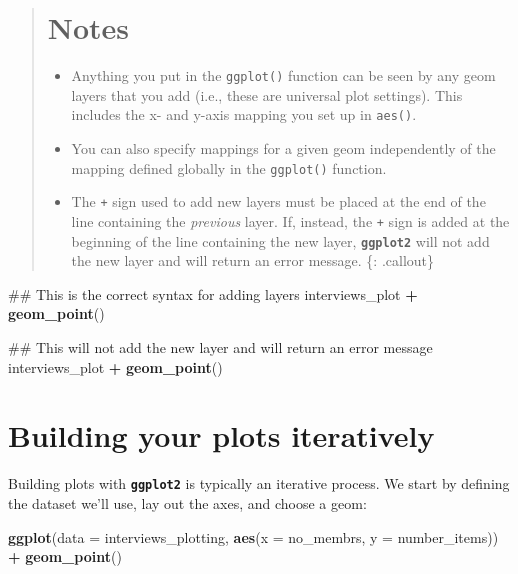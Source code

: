 \documentclass[]{book}
\newenvironment{Shaded}{\begin{snugshade}}{\end{snugshade}}
\newcommand{\KeywordTok}[1]{\textcolor[rgb]{0.13,0.29,0.53}{\textbf{#1}}}
\newcommand{\DataTypeTok}[1]{\textcolor[rgb]{0.13,0.29,0.53}{#1}}
\newcommand{\StringTok}[1]{\textcolor[rgb]{0.31,0.60,0.02}{#1}}
\newcommand{\OperatorTok}[1]{\textcolor[rgb]{0.81,0.36,0.00}{\textbf{#1}}}
\newcommand{\NormalTok}[1]{#1}
\providecommand{\tightlist}{%
  \setlength{\itemsep}{0pt}\setlength{\parskip}{0pt}}
\begin{document}
\begin{quote}
\section{Notes}\label{notes}

\begin{itemize}
\tightlist
\item
  Anything you put in the \texttt{ggplot()} function can be seen by any
  geom layers that you add (i.e., these are universal plot settings).
  This includes the x- and y-axis mapping you set up in \texttt{aes()}.
\item
  You can also specify mappings for a given geom independently of the
  mapping defined globally in the \texttt{ggplot()} function.
\item
  The \texttt{+} sign used to add new layers must be placed at the end
  of the line containing the \emph{previous} layer. If, instead, the
  \texttt{+} sign is added at the beginning of the line containing the
  new layer, \textbf{\texttt{ggplot2}} will not add the new layer and
  will return an error message. \{: .callout\}
\end{itemize}
\end{quote}

\begin{Shaded}
\begin{Highlighting}[]
\NormalTok{## This is the correct syntax for adding layers}
\NormalTok{interviews_plot }\OperatorTok{+}
\StringTok{    }\KeywordTok{geom_point}\NormalTok{()}

\NormalTok{## This will not add the new layer and will return an error message}
\NormalTok{interviews_plot}
\OperatorTok{+}\StringTok{ }\KeywordTok{geom_point}\NormalTok{()}
\end{Highlighting}
\end{Shaded}

\section{Building your plots
iteratively}\label{building-your-plots-iteratively}

Building plots with \textbf{\texttt{ggplot2}} is typically an iterative
process. We start by defining the dataset we'll use, lay out the axes,
and choose a geom:

\begin{Shaded}
\begin{Highlighting}[]
\KeywordTok{ggplot}\NormalTok{(}\DataTypeTok{data =}\NormalTok{ interviews_plotting, }\KeywordTok{aes}\NormalTok{(}\DataTypeTok{x =}\NormalTok{ no_membrs, }\DataTypeTok{y =}\NormalTok{ number_items)) }\OperatorTok{+}
\StringTok{    }\KeywordTok{geom_point}\NormalTok{()}
\end{Highlighting}
\end{Shaded}
\end{document}
